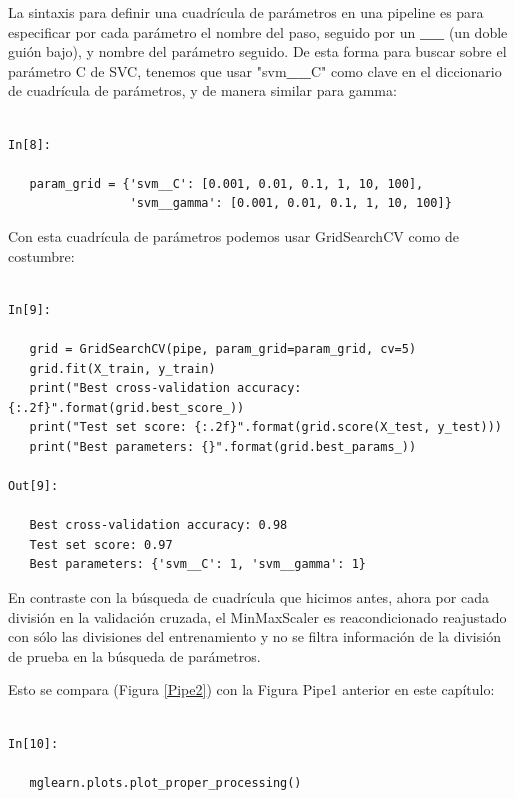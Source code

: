    
   La sintaxis para definir una cuadrícula de parámetros en una pipeline  es para especificar por  cada parámetro el nombre del paso, seguido por un {\bf  \_\!\_} (un doble guión bajo), y  nombre del parámetro seguido.   De esta forma para buscar sobre el parámetro C  de SVC, tenemos que usar  {\ttfamily "{}svm{\bf \_\!\_}C"{} } como clave en el diccionario de cuadrícula de parámetros, y de manera similar para {\ttfamily gamma}:   
   
   \begin{lstlisting}   
   
In[8]:
   
   param_grid = {'svm__C': [0.001, 0.01, 0.1, 1, 10, 100],
                 'svm__gamma': [0.001, 0.01, 0.1, 1, 10, 100]} 
   \end{lstlisting}
   
   Con esta cuadrícula de parámetros podemos usar {\ttfamily GridSearchCV} como de costumbre:
     
        
   \begin{lstlisting}   
   
In[9]:
   
   grid = GridSearchCV(pipe, param_grid=param_grid, cv=5)
   grid.fit(X_train, y_train)
   print("Best cross-validation accuracy: {:.2f}".format(grid.best_score_))
   print("Test set score: {:.2f}".format(grid.score(X_test, y_test)))
   print("Best parameters: {}".format(grid.best_params_))
   
Out[9]:
   
   Best cross-validation accuracy: 0.98
   Test set score: 0.97
   Best parameters: {'svm__C': 1, 'svm__gamma': 1}   
   \end{lstlisting}
   
   En contraste con la búsqueda de cuadrícula que hicimos antes, ahora por  cada división en la validación cruzada, el {\ttfamily MinMaxScaler} es reacondicionado reajustado con sólo las divisiones del entrenamiento y no se filtra información de la división de prueba en la búsqueda de parámetros. 
   
   Esto se compara  (Figura \ref{Pipe2}) con la Figura {Pipe1} anterior en este capítulo:   
   
   \begin{lstlisting}
   
In[10]:
   
   mglearn.plots.plot_proper_processing()
   
   \end{lstlisting}
   
